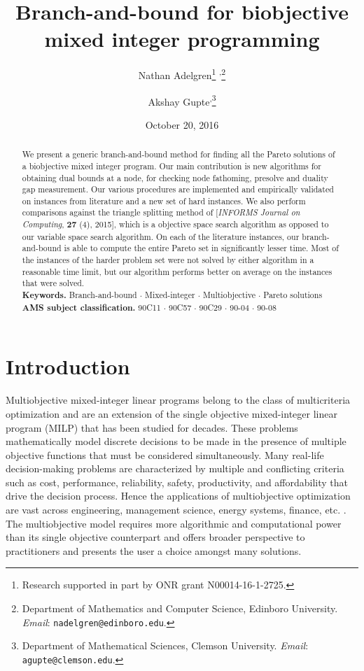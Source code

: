 \documentclass[11.5pt]{article}
\title{Branch-and-bound for biobjective mixed integer programming}
\author{Nathan Adelgren\thanks{Research supported in part by ONR grant  N00014-16-1-2725.} \textsuperscript{,}\footnote{Department of Mathematics and Computer Science, Edinboro University. \emph{Email}: \texttt{nadelgren@edinboro.edu}.} \and Akshay Gupte\footnotemark[1] \textsuperscript{,}\footnote{Department of Mathematical Sciences, Clemson University. \emph{Email}: \texttt{agupte@clemson.edu}.}}
\date{October 20, 2016}
\newcommand{\keywords}[1]{\medskip\\
\noindent\textbf{Keywords.} #1}
\newcommand{\subclass}[1]{\smallskip\\
\noindent\textbf{AMS subject classification.} #1}
\begin{document}
\maketitle
{
\newcommand{\sep}{$\cdot$ }
\begin{abstract}
We present a generic branch-and-bound method for finding all the Pareto solutions of a biobjective mixed integer program. Our main contribution is new algorithms for obtaining dual bounds at a node, for checking node fathoming, presolve and duality gap measurement. Our various procedures are implemented and empirically validated on instances from literature and a new set of hard instances. We also perform comparisons against the triangle splitting method of \citeauthor{boland2015acriterion} [\emph{INFORMS Journal on Computing}, \textbf{27} (4), 2015], which is a objective space search algorithm as opposed to our variable space search algorithm. On each of the literature instances, our branch-and-bound is able to compute the entire Pareto set in significantly lesser time. Most of the instances of the harder problem set were not solved by either algorithm  in a reasonable time limit, but our algorithm performs better on average on the instances that were solved.
\keywords{Branch-and-bound \sep Mixed-integer \sep Multiobjective \sep Pareto solutions}
\subclass{90C11 \sep 90C57 \sep 90C29 \sep 90-04 \sep 90-08}
\end{abstract}
}
%

\section{Introduction}
Multiobjective mixed-integer linear programs belong to the class of multicriteria optimization \citep{ehrgott2005multicriteria} and are an extension of the single objective mixed-integer linear program (MILP) that has been studied for decades. These problems mathematically model discrete decisions to be made in the presence of multiple objective functions that must be considered simultaneously. Many real-life decision-making problems are characterized by multiple and conflicting criteria such as cost, performance, reliability, safety, productivity, and  affordability that drive the decision process. Hence the applications of multiobjective optimization are vast across engineering, management science, energy systems, finance, etc. \citep{HM2000,fugenschuh2006multicriteria,ehrgott2000survey,Jozefowiez2008293,hirschberger2013computing}. The multiobjective model requires more algorithmic and computational power than its single objective counterpart and offers broader perspective to practitioners and presents the user a choice amongst many solutions.  
\end{document}
